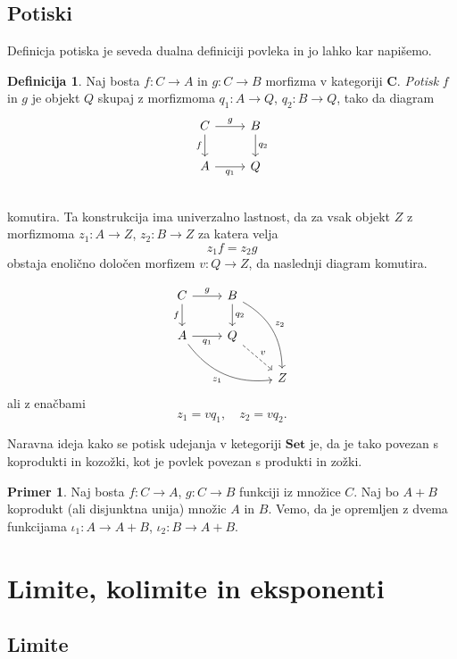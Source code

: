 \documentclass[12pt,a4paper]{book}
\theoremstyle{definition}
\newtheorem{definicija}{Definicija}[chapter]
\theoremstyle{plain}
\theoremstyle{definition}
\newtheorem{primer}{Primer}[section]
\theoremstyle{remark}
\newcommand{\cat}[1]{\textbf{#1}}
\begin{document}
\subsection{Potiski}

Definicja potiska je seveda dualna definiciji povleka in jo lahko kar napišemo.

\begin{definicija}
Naj bosta $f: C \to A$ in $g : C \to B$ morfizma v kategoriji $\cat{C}$. \emph{Potisk} $f$ in $g$ je objekt $Q$ skupaj z morfizmoma $q_1 : A \to Q$, $q_2 : B \to Q$, tako da diagram
$$\begin{tikzcd}
C \ar[r, "g"] \ar[d, "f"'] & B \ar[d, "q_2"] \\
A \ar[r, "q_1"'] & Q \\
\end{tikzcd}$$
komutira. Ta konstrukcija ima univerzalno lastnost, da za vsak objekt $Z$ z morfizmoma $z_1 : A \to Z$, $z_2 : B \to Z$ za katera velja $$z_1f = z_2g$$
obstaja enolično določen morfizem $v : Q \to Z$, da naslednji diagram komutira.

$$\begin{tikzcd}
C \ar[r, "g"] \ar[d, "f"'] & B \ar[d, "q_2"] \ar[ddr, bend left, "z_2"] & \\
A \ar[r, "q_1"'] \ar[drr, bend right, "z_1"'] & Q \ar[dr, dashed, "v"] & \\
& & Z 
\end{tikzcd}$$
ali z enačbami $$z_1 = v q_1, \quad z_2 = v q_2.$$
\end{definicija}

Naravna ideja kako se potisk udejanja v ketegoriji $\cat{Set}$ je, da je tako povezan s koprodukti in kozožki, kot je povlek povezan s produkti in zožki.

\begin{primer}
Naj bosta $f : C \to A$, $g: C \to B$ funkciji iz množice $C$. Naj bo $A + B$ koprodukt (ali disjunktna unija) množic $A$ in $B$. Vemo, da je opremljen z dvema funkcijama $\iota_1 : A \to A + B$, $\iota_2 : B \to A+B$.
\end{primer}

\section{Limite, kolimite in eksponenti}


\subsection{Limite}
\end{document}
